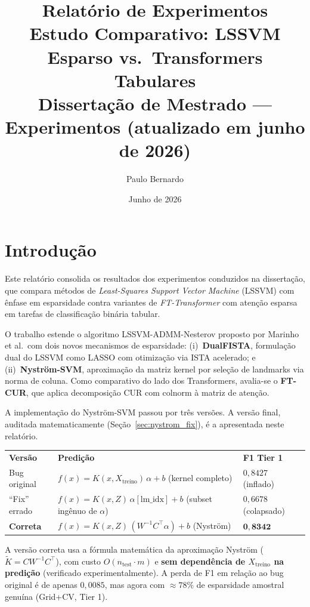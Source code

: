 \documentclass[12pt,a4paper]{article}
\title{\textbf{Relatório de Experimentos}\\[0.4em]
\large Estudo Comparativo: LSSVM Esparso vs.\ Transformers Tabulares\\[0.2em]
\normalsize Dissertação de Mestrado --- Experimentos (atualizado em junho de 2026)}
\author{Paulo Bernardo}
\date{Junho de 2026}
\begin{document}
\maketitle
\tableofcontents
\newpage

\section{Introdução}
\label{sec:intro}

Este relatório consolida os resultados dos experimentos conduzidos na dissertação,
que compara métodos de \textit{Least-Squares Support Vector Machine} (LSSVM) com
ênfase em esparsidade contra variantes de \textit{FT-Transformer} com atenção
esparsa em tarefas de classificação binária tabular.

O trabalho estende o algoritmo LSSVM-ADMM-Nesterov proposto por Marinho et al.\
com dois novos mecanismos de esparsidade: (i)~\textbf{DualFISTA}, formulação dual
do LSSVM como LASSO com otimização via ISTA acelerado; e (ii)~\textbf{Nyström-SVM},
aproximação da matriz kernel por seleção de landmarks via norma de coluna.
Como comparativo do lado dos Transformers, avalia-se o \textbf{FT-CUR}, que aplica
decomposição CUR com colnorm à matriz de atenção.

\begin{tcolorbox}[
  colback=warnbg, colframe=warnborder, title=\textbf{Auditoria do Nyström-SVM --- três versões},
  fonttitle=\bfseries, breakable
]
A implementação do Nyström-SVM passou por três versões. A versão final, auditada
matematicamente (Seção~\ref{sec:nystrom_fix}), é a apresentada neste relatório.

\begin{tabular}{lll}
\textbf{Versão} & \textbf{Predição} & \textbf{F1 Tier 1} \\
Bug original    & $f(x){=}K(x, X_\text{treino})\,\alpha + b$ (kernel completo)         & $0{,}8427$ (inflado) \\
``Fix'' errado  & $f(x){=}K(x, Z)\,\alpha[\text{lm\_idx}] + b$ (subset ingênuo de $\alpha$) & $0{,}6678$ (colapsado) \\
\textbf{Correta} & $f(x){=}K(x, Z)\,(W^{-1}C^\top\alpha) + b$ (Nyström)                & $\mathbf{0{,}8342}$ \\
\end{tabular}

A versão correta usa a fórmula matemática da aproximação Nyström
($\tilde K = CW^{-1}C^\top$), com custo $O(n_\text{test}\cdot m)$ e
\textbf{sem dependência de $X_\text{treino}$ na predição} (verificado experimentalmente).
A perda de F1 em relação ao bug original é de apenas $0{,}0085$, mas agora com
$\approx 78\%$ de esparsidade amostral genuína (Grid+CV, Tier 1).
\end{tcolorbox}
\end{document}
